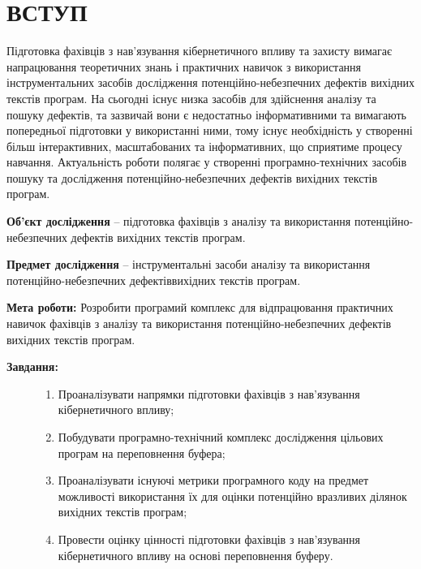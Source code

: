 \chapter*{ВСТУП}
\label{1entrance::doc}\label{1entrance:id1}
Підготовка фахівців з нав’язування кібернетичного впливу та захисту вимагає напрацювання теоретичних знань і практичних навичок з використання інструментальних засобів дослідження потенційно-небезпечних дефектів вихідних текстів програм. На сьогодні існує низка засобів для здійснення аналізу та пошуку дефектів, та зазвичай вони є недостатньо інформативними та вимагають попередньої підготовки у використанні ними, тому існує необхідність у створенні більш інтерактивних, масштабованих та інформативних, що сприятиме процесу навчання. Актуальність роботи полягає у створенні програмно-технічних засобів пошуку та дослідження потенційно-небезпечних дефектів вихідних текстів програм.

{\bf Об’єкт дослідження} – підготовка фахівців з аналізу та використання потенційно-небезпечних дефектів вихідних текстів програм.

{\bf Предмет дослідження} – інструментальні засоби  аналізу та використання потенційно-небезпечних дефектіввихідних текстів програм.

{\bf Мета роботи:} Розробити програмий комплекс для відпрацювання практичних навичок фахівців з аналізу та використання потенційно-небезпечних дефектів вихідних текстів програм.
\begin{description}
\item[{{\bf Завдання:}}] \leavevmode\begin{enumerate}
\item {} 
Проаналізувати напрямки підготовки фахівців з нав’язування кібернетичного впливу;

\item {} 
Побудувати програмно-технічний комплекс дослідження цільових програм на переповнення буфера;

\item {} 
Проаналізувати існуючі метрики програмного коду на предмет можливості використання їх для оцінки потенційно вразливих ділянок вихідних текстів програм;

\item {} 
Провести оцінку цінності підготовки фахівців з нав’язування кібернетичного впливу на основі переповнення буферу.
\end{enumerate}
\end{description}